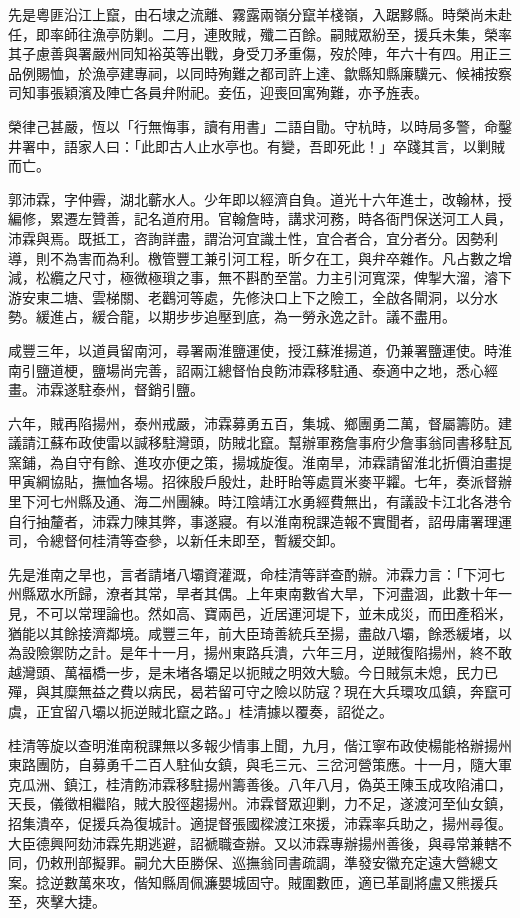 \begin{pinyinscope}
先是粵匪沿江上竄，由石埭之流離、霧露兩嶺分竄羊棧嶺，入踞黟縣。時榮尚未赴任，即率師往漁亭防剿。二月，連敗賊，殲二百餘。嗣賊眾紛至，援兵未集，榮率其子慮善與署嚴州同知裕英等出戰，身受刀矛重傷，歿於陣，年六十有四。用正三品例賜恤，於漁亭建專祠，以同時殉難之都司許上達、歙縣知縣廉驥元、候補按察司知事張穎濱及陣亡各員弁附祀。妾伍，迎喪回寓殉難，亦予旌表。

榮律己甚嚴，恆以「行無悔事，讀有用書」二語自勖。守杭時，以時局多警，命鑿井署中，語家人曰：「此即古人止水亭也。有變，吾即死此！」卒踐其言，以剿賊而亡。

郭沛霖，字仲霽，湖北蘄水人。少年即以經濟自負。道光十六年進士，改翰林，授編修，累遷左贊善，記名道府用。官翰詹時，講求河務，時各衙門保送河工人員，沛霖與焉。既抵工，咨詢詳盡，謂治河宜識土性，宜合者合，宜分者分。因勢利導，則不為害而為利。檄管豐工兼引河工程，昕夕在工，與弁卒雜作。凡占數之增減，松纜之尺寸，極微極瑣之事，無不斟酌至當。力主引河寬深，俾掣大溜，濬下游安東二塘、雲梯關、老鸛河等處，先修決口上下之險工，全啟各閘洞，以分水勢。緩進占，緩合龍，以期步步追壓到底，為一勞永逸之計。議不盡用。

咸豐三年，以道員留南河，尋署兩淮鹽運使，授江蘇淮揚道，仍兼署鹽運使。時淮南引鹽道梗，鹽場尚完善，詔兩江總督怡良飭沛霖移駐通、泰適中之地，悉心經畫。沛霖遂駐泰州，督銷引鹽。

六年，賊再陷揚州，泰州戒嚴，沛霖募勇五百，集城、鄉團勇二萬，督屬籌防。建議請江蘇布政使雷以諴移駐灣頭，防賊北竄。幫辦軍務詹事府少詹事翁同書移駐瓦窯鋪，為自守有餘、進攻亦便之策，揚城旋復。淮南旱，沛霖請留淮北折價洎畫提甲寅綱協貼，撫恤各場。招徠殷戶殷灶，赴盱眙等處買米麥平糶。七年，奏派督辦里下河七州縣及通、海二州團練。時江陰靖江水勇經費無出，有議設卡江北各港令自行抽釐者，沛霖力陳其弊，事遂寢。有以淮南稅課造報不實聞者，詔毋庸署理運司，令總督何桂清等查參，以新任未即至，暫緩交卸。

先是淮南之旱也，言者請堵八壩資灌溉，命桂清等詳查酌辦。沛霖力言：「下河七州縣眾水所歸，潦者其常，旱者其偶。上年東南數省大旱，下河盡涸，此數十年一見，不可以常理論也。然如高、寶兩邑，近居運河堤下，並未成災，而田產稻米，猶能以其餘接濟鄰境。咸豐三年，前大臣琦善統兵至揚，盡啟八壩，餘悉緩堵，以為設險禦防之計。是年十一月，揚州東路兵潰，六年三月，逆賊復陷揚州，終不敢越灣頭、萬福橋一步，是未堵各壩足以扼賊之明效大驗。今日賊氛未熄，民力已殫，與其糜無益之費以病民，曷若留可守之險以防寇？現在大兵環攻瓜鎮，奔竄可虞，正宜留八壩以扼逆賊北竄之路。」桂清據以覆奏，詔從之。

桂清等旋以查明淮南稅課無以多報少情事上聞，九月，偕江寧布政使楊能格辦揚州東路團防，自募勇千二百人駐仙女鎮，與毛三元、三岔河營策應。十一月，隨大軍克瓜洲、鎮江，桂清飭沛霖移駐揚州籌善後。八年八月，偽英王陳玉成攻陷浦口，天長，儀徵相繼陷，賊大股徑趨揚州。沛霖督眾迎剿，力不足，遂渡河至仙女鎮，招集潰卒，促援兵為復城計。適提督張國樑渡江來援，沛霖率兵助之，揚州尋復。大臣德興阿劾沛霖先期逃避，詔褫職查辦。又以沛霖專辦揚州善後，與尋常兼轄不同，仍敕刑部擬罪。嗣允大臣勝保、巡撫翁同書疏調，準發安徽充定遠大營總文案。捻逆數萬來攻，偕知縣周佩濂嬰城固守。賊圍數匝，適已革副將盧又熊援兵至，夾擊大捷。


\end{pinyinscope}

